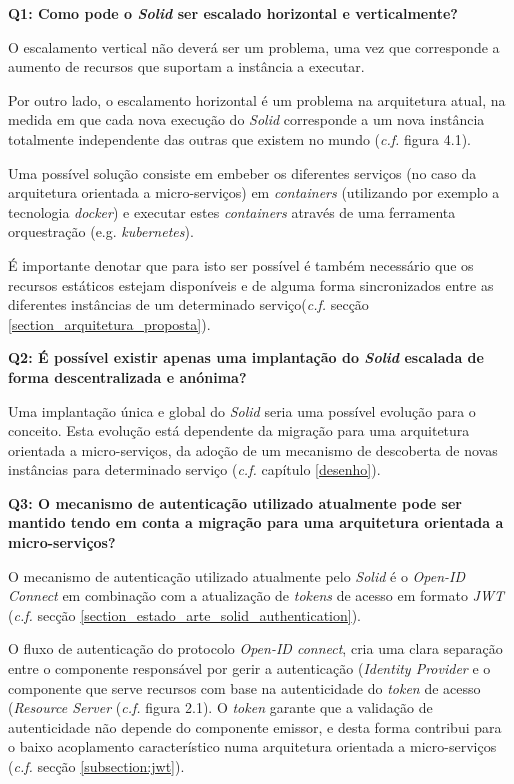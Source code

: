 \newhalfpara

\textbf{Q1: {Como pode o \emph{Solid} ser escalado horizontal e verticalmente?}}

O escalamento vertical não deverá ser um problema, uma vez que corresponde a aumento de recursos que suportam a instância a executar.

Por outro lado, o escalamento horizontal é um problema na arquitetura atual, na medida em que cada nova execução do \emph{Solid} corresponde a um nova instância totalmente independente das outras que existem no mundo (\emph{c.f.} figura 4.1).

Uma possível solução consiste em embeber os diferentes serviços (no caso da arquitetura orientada a micro-serviços) em \emph{containers} (utilizando por exemplo a tecnologia \emph{docker}) e executar estes \emph{containers} através de uma ferramenta orquestração (e.g. \emph{kubernetes}).

É importante denotar que para isto ser possível é também necessário que os recursos estáticos estejam disponíveis e de alguma forma sincronizados entre as diferentes instâncias de um determinado serviço(\emph{c.f.} secção \ref{section_arquitetura_proposta}).

\newhalfpara

\textbf{Q2: É possível existir apenas uma implantação do \emph{Solid} escalada de forma descentralizada e anónima?}

Uma implantação única e global do \emph{Solid} seria uma possível evolução para o conceito. Esta evolução está dependente da migração para uma arquitetura orientada a micro-serviços, da adoção de um mecanismo de descoberta de novas instâncias para determinado serviço (\emph{c.f.} capítulo \ref{desenho}).

\newhalfpara

\textbf{Q3: O mecanismo de autenticação utilizado atualmente pode ser mantido tendo em conta a migração para uma arquitetura orientada a micro-serviços?}

O mecanismo de autenticação utilizado atualmente pelo \emph{Solid} é o \emph{Open-ID Connect} em combinação com a atualização de \emph{tokens} de acesso em formato \emph{\acrshort{JWT}} (\emph{c.f.} secção \ref{section_estado_arte_solid_authentication}).

O fluxo de autenticação do protocolo \emph{Open-ID connect}, cria uma clara separação entre o componente responsável por gerir a autenticação (\emph{Identity Provider} e o componente que serve recursos com base na autenticidade do \emph{token} de acesso (\emph{Resource Server} (\emph{c.f.} figura 2.1). O \emph{token} garante que a validação de autenticidade não depende do componente emissor, e desta forma contribui para o baixo acoplamento característico numa arquitetura orientada a micro-serviços (\emph{c.f.} secção \ref{subsection:jwt}).


